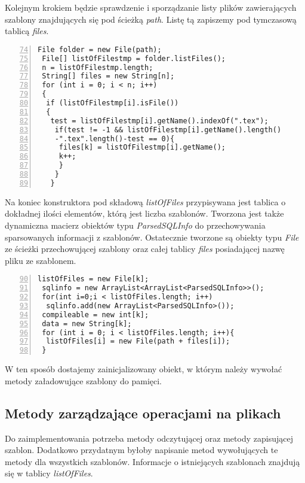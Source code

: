     
    Kolejnym krokiem będzie sprawdzenie i sporządzanie listy plików zawierających szablony znajdujących się pod ścieżką \emph{path}. Listę tą zapiszemy pod tymczasową tablicą  \emph{files}.
 \begin{lstlisting}[numbers=left,firstnumber=74]
 File folder = new File(path);
 File[] listOfFilestmp = folder.listFiles(); 
 n = listOfFilestmp.length;
 String[] files = new String[n];
 for (int i = 0; i < n; i++) 
 {
  if (listOfFilestmp[i].isFile()) 
  {
   test = listOfFilestmp[i].getName().indexOf(".tex");
    if(test != -1 && listOfFilestmp[i].getName().length()
    -".tex".length()-test == 0){
     files[k] = listOfFilestmp[i].getName();
     k++;
     }
    }
   }
\end{lstlisting}


Na koniec konstruktora pod składową \emph{listOfFiles} przypisywana jest tablica o dokładnej ilości elementów, którą jest liczba szablonów. Tworzona jest także dynamiczna macierz obiektów typu \emph{ParsedSQLInfo} do przechowywania sparsowanych informacji z szablonów. Ostatecznie tworzone są obiekty typu \emph{File} ze ścieżki przechowującej szablony oraz całej tablicy \emph{files} posiadającej nazwę pliku ze szablonem.
    
 \begin{lstlisting}[numbers=left,firstnumber=90]
 listOfFiles = new File[k];
 sqlinfo = new ArrayList<ArrayList<ParsedSQLInfo>>();
 for(int i=0;i < listOfFiles.length; i++)
  sqlinfo.add(new ArrayList<ParsedSQLInfo>());
 compileable = new int[k];
 data = new String[k];
 for (int i = 0; i < listOfFiles.length; i++){
  listOfFiles[i] = new File(path + files[i]);
 }
\end{lstlisting}
  
  W ten sposób dostajemy zainicjalizowany obiekt, w którym należy wywołać metody załadowujące szablony do pamięci.
  
  
\subsection{Metody zarządzające operacjami na plikach}

Do zaimplementowania potrzeba metody odczytującej oraz metody zapisującej szablon. Dodatkowo przydatnym byłoby napisanie metod wywołujących te metody dla wszystkich szablonów. Informacje o istniejących szablonach znajdują się w tablicy \emph{listOfFiles}. \\
\par

